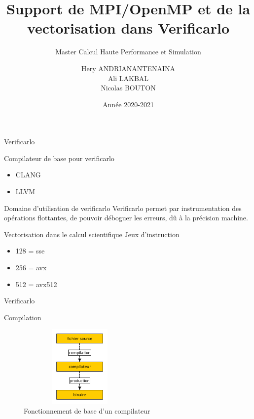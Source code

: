 \documentclass{beamer}
\title[Support pour Verificarlo]{Support de MPI/OpenMP et de la vectorisation dans Verificarlo}
\subtitle{Master Calcul Haute Performance et Simulation}
\author[Hery, Ali, Nicolas]{Hery ANDRIANANTENAINA \\ Ali LAKBAL \\ Nicolas BOUTON}
\institute[]{\textbf{Encadrant:} Eric PETIT}
\date{Année 2020-2021}
\begin{document}
\maketitle

\begin{frame}{Verificarlo}
    \begin{block}{Compilateur de base pour verificarlo}
      \begin{itemize}
          \item CLANG
          \item LLVM
      \end{itemize}
    \end{block}
  \begin{block}{Domaine d'utilisation de verificarlo}
    Verificarlo permet par instrumentation des opérations flottantes, de pouvoir déboguer les erreurs, dû à la précision machine.
  \end{block}
  \begin{block}{Vectorisation dans le calcul scientifique}
    Jeux d'instruction 
        \begin{itemize}
            \item 128 = sse
            \item 256 = avx
            \item 512 = avx512
        \end{itemize}
  \end{block}
\end{frame}

\begin{frame}{Verificarlo}
    \begin{block}{Compilation}
      \begin{figure}
          \centering
          \includegraphics[width=6cm,height=4cm]{../ressources/compilation.png}
          \caption{Fonctionnement de base d'un compilateur}
          \label{fig:my_label}
      \end{figure}
    \end{block}
\end{frame}
\end{document}
